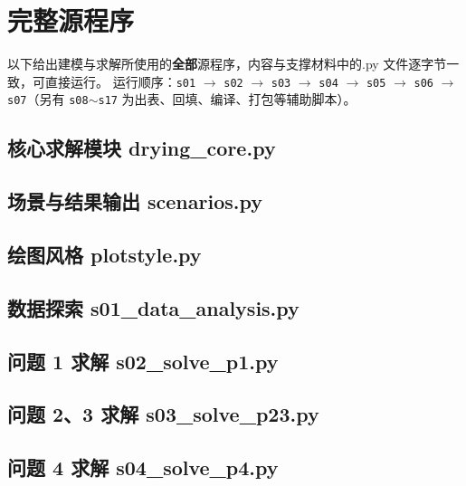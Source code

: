 \section{完整源程序}

以下给出建模与求解所使用的\textbf{全部}源程序，内容与支撑材料中的.py 文件逐字节一致，可直接运行。
运行顺序：\texttt{s01} $\to$ \texttt{s02} $\to$ \texttt{s03} $\to$ \texttt{s04} $\to$ \texttt{s05} $\to$ \texttt{s06} $\to$ \texttt{s07}（另有 \texttt{s08}$\sim$\texttt{s17} 为出表、回填、编译、打包等辅助脚本）。

\subsection{核心求解模块 drying\_core.py}


\subsection{场景与结果输出 scenarios.py}


\subsection{绘图风格 plotstyle.py}


\subsection{数据探索 s01\_data\_analysis.py}


\subsection{问题 1 求解 s02\_solve\_p1.py}


\subsection{问题 2、3 求解 s03\_solve\_p23.py}


\subsection{问题 4 求解 s04\_solve\_p4.py}


